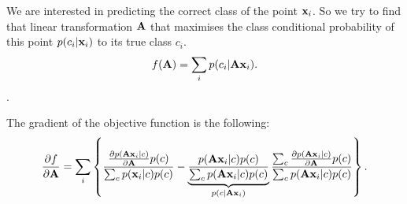 We are interested in predicting the correct class of the point $\mathbf{x}_i$. So we try to find that linear transformation $\mathbf{A}$ that maximises the class conditional probability of this point $p(c_i|\mathbf{x}_i)$ to its true class $c_i$. 
\begin{align}
	f(\mathbf{A}) = \sum_i p(c_i|\mathbf{A}\mathbf{x}_i).
	\label{eq:nca-cc-kde-obj}
\end{align}.

The gradient of the objective function is the following:
\begin{align}
	\frac{\partial f}{\partial \mathbf{A}} = 
	  \sum_i \left\{ 
	  			\frac
	  			{
	  				\frac{\partial p(\mathbf{A}\mathbf{x}_i|c)}{\partial \mathbf{A}}p(c)
	  			}
	  			{
	  				\sum_c p(\mathbf{x}_i|c)p(c)
	  			}
	  			- \underbrace{\frac{
	  				p(\mathbf{A}\mathbf{x}_i|c)p(c)
	  			}{
	  				\sum_c p(\mathbf{A}\mathbf{x}_i|c)p(c)		
	  			}}_{p(c|\mathbf{A}\mathbf{x}_i)}
	  			\frac{
	  				\sum_c \frac{\partial p(\mathbf{A}\mathbf{x}_i|c)}{\partial \mathbf{A}}p(c)
	  			}{
	  				\sum_c p(\mathbf{A}\mathbf{x}_i|c)p(c)
	  			}
	  	     \right \}.
	\label{eq:nca-cc-kde-grad}
\end{align}